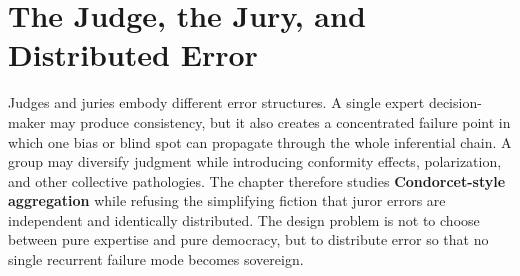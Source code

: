 
\chapter{The Judge, the Jury, and Distributed Error}
\label{ch:ch039}

Judges and juries embody different error structures. A single expert decision-maker may produce consistency, but it also creates a concentrated failure point in which one bias or blind spot can propagate through the whole inferential chain. A group may diversify judgment while introducing conformity effects, polarization, and other collective pathologies. The chapter therefore studies \textbf{Condorcet-style aggregation} while refusing the simplifying fiction that juror errors are independent and identically distributed. The design problem is not to choose between pure expertise and pure democracy, but to distribute error so that no single recurrent failure mode becomes sovereign.
